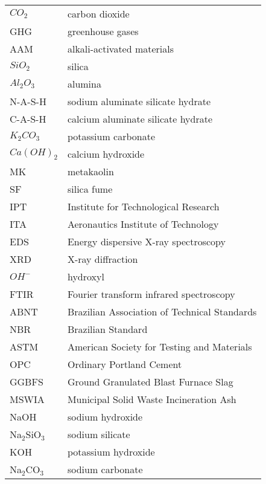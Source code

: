 \begin{longtable}{ll}
$CO_2$ & carbon dioxide \\
GHG & greenhouse gases \\
AAM & alkali-activated materials \\
$ SiO_2$ & silica \\
$ Al_2O_3$ & alumina \\
N-A-S-H & sodium aluminate silicate hydrate \\
C-A-S-H & calcium aluminate silicate hydrate  \\
$K_2CO_3$ & potassium carbonate \\
$Ca(OH)_2$ & calcium hydroxide \\
MK & metakaolin \\
SF & silica fume \\
IPT & Institute for Technological Research \\
ITA & Aeronautics Institute of Technology \\
EDS & Energy dispersive X-ray spectroscopy \\
XRD & X-ray diffraction \\
$OH^-$ & hydroxyl \\
FTIR & Fourier transform infrared spectroscopy \\
ABNT & Brazilian Association of Technical Standards \\
NBR & Brazilian Standard \\
ASTM & American Society for Testing and Materials \\
OPC & Ordinary Portland Cement \\
GGBFS & Ground Granulated Blast Furnace Slag \\
MSWIA & Municipal Solid Waste Incineration Ash \\
NaOH & sodium hydroxide \\
Na$_2$SiO$_3$ & sodium silicate \\
KOH & potassium hydroxide \\
Na$_2$CO$_3$ & sodium carbonate \\
\end{longtable}
